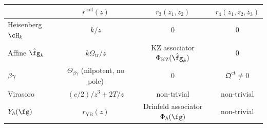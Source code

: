 \begin{example}
\label{ex:e1-shadow-archetypes}
\begin{center}
\renewcommand{\arraystretch}{1.15}
\begin{tabular}{lccc}
\toprule
& \emph{$r^{\mathrm{coll}}(z)$}
& \emph{$r_3(z_1,z_2)$}
& \emph{$r_4(z_1,z_2,z_3)$} \\
\midrule
Heisenberg $\cH_k$
& $k/z$
& $0$
& $0$ \\
Affine $\hat\fg_k$
& $k\Omega_{\mathrm{tr}}/z$
& KZ associator $\Phi_{\mathrm{KZ}}(\hat\fg_k)$
& $0$ \\
$\beta\gamma$
& $\Theta_{\beta\gamma}$ (nilpotent, no pole)
& $0$
& $\mathfrak{Q}^{\mathrm{ct}} \neq 0$ \\
Virasoro
& $(c/2)/z^3 + 2T/z$
& non-trivial
& non-trivial \\
$Y_\hbar(\fg)$
& $r_{\mathrm{YB}}(z)$
& Drinfeld associator $\Phi_{\hbar}(\fg)$
& non-trivial \\
\bottomrule
\end{tabular}
\end{center}
\end{example}

